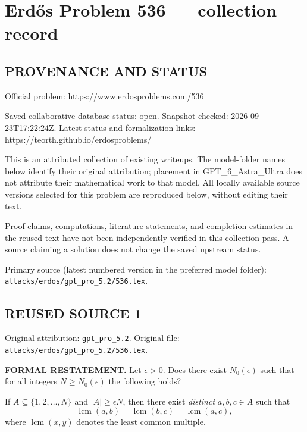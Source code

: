 \section*{Erd\H{o}s Problem 536 --- collection record}

\subsection*{PROVENANCE AND STATUS}
Official problem: https://www.erdosproblems.com/536

Saved collaborative-database status: open.
Snapshot checked: 2026-09-23T17:22:24Z.
Latest status and formalization links: https://teorth.github.io/erdosproblems/

This is an attributed collection of existing writeups. The model-folder names below identify their original attribution; placement in GPT\_6\_Astra\_Ultra does not attribute their mathematical work to that model. All locally available source versions selected for this problem are reproduced below, without editing their text.

Proof claims, computations, literature statements, and completion estimates in the reused text have not been independently verified in this collection pass. A source claiming a solution does not change the saved upstream status.

Primary source (latest numbered version in the preferred model folder): \texttt{attacks/erdos/gpt\_pro\_5.2/536.tex}.

\subsection*{REUSED SOURCE 1}
Original attribution: \texttt{gpt\_pro\_5.2}.
Original file: \texttt{attacks/erdos/gpt\_pro\_5.2/536.tex}.



\noindent\textbf{FORMAL RESTATEMENT.}
Let $\epsilon>0$. Does there exist $N_0(\epsilon)$ such that for all integers $N\ge N_0(\epsilon)$ the following holds?

If $A\subseteq \{1,2,\dots,N\}$ and $|A|\ge \epsilon N$, then there exist \emph{distinct} $a,b,c\in A$ such that
\[
\operatorname{lcm}(a,b)=\operatorname{lcm}(b,c)=\operatorname{lcm}(a,c),
\]
where $\operatorname{lcm}(x,y)$ denotes the least common multiple.

